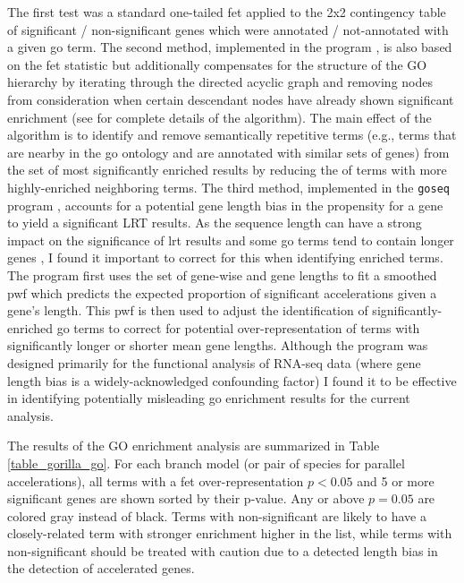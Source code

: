 The first test was a standard one-tailed \ac{fet} applied to the 2x2
contingency table of significant / non-significant genes which were
annotated / not-annotated with a given \ac{go} term. The second
method, implemented in the \topgo program \citep{Alexa2006a}, is also
based on the \ac{fet} statistic but additionally compensates for the
structure of the GO hierarchy by iterating through the directed
acyclic graph and removing nodes from consideration when certain
descendant nodes have already shown significant enrichment (see
\citet{Alexa2006a} for complete details of the algorithm). The main
effect of the \topgo algorithm is to identify and remove semantically
repetitive terms (e.g., terms that are nearby in the \ac{go} ontology
and are annotated with similar sets of genes) from the set of most
significantly enriched results by reducing the \pvs of terms with more
highly-enriched neighboring terms. The third method, implemented in
the \texttt{goseq} program \citep{Young2010a}, accounts for a
potential gene length bias in the propensity for a gene to yield a
significant LRT results. As the sequence length can have a strong
impact on the significance of \ac{lrt} results \citep{Anisimova2001}
and some \ac{go} terms tend to contain longer genes
\citep{Young2010a}, I found it important to correct for this when
identifying enriched terms. The \goseq program first uses the set of
gene-wise \pvs and gene lengths to fit a smoothed \ac{pwf} which
predicts the expected proportion of significant accelerations given a
gene’s length. This \ac{pwf} is then used to adjust the identification
of significantly-enriched \ac{go} terms to correct for potential
over-representation of terms with significantly longer or shorter mean
gene lengths. Although the \goseq program was designed primarily for
the functional analysis of RNA-seq data (where gene length bias is a
widely-acknowledged confounding factor) I found it to be effective in
identifying potentially misleading \ac{go} enrichment results for the
current analysis.

The results of the GO enrichment analysis are summarized in Table
\ref{table_gorilla_go}. For each branch model (or pair of species for
parallel accelerations), all terms with a \ac{fet} over-representation
$p<0.05$ and 5 or more significant genes are shown sorted by their
\topgo p-value. Any \topgo or \goseq \pvs above $p=0.05$ are colored
gray instead of black. Terms with non-significant \topgo \pvs are
likely to have a closely-related term with stronger enrichment higher
in the list, while terms with non-significant \goseq \pvs should be
treated with caution due to a detected length bias in the detection of
accelerated genes.

